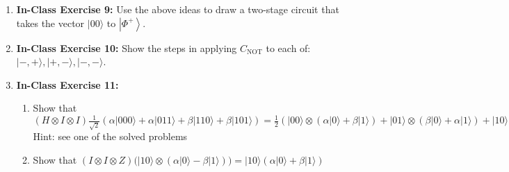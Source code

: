 \documentclass[main.tex]{subfiles}
\begin{document}
\begin{enumerate}
\item[] \textbf{In-Class Exercise 9:} Use the above ideas to draw a two-stage circuit that takes the vector $|00\rangle$ to $\left|\Phi^{+}\right\rangle$.

\item[] \textbf{In-Class Exercise 10:} Show the steps in applying $C_{\text{NOT}}$ to each of: $|-,+\rangle,|+,-\rangle,|-,-\rangle$.


\item[] \textbf{In-Class Exercise 11:}
\begin{enumerate}
    \item [1.] Show that $(H \otimes I \otimes I) \frac{1}{\sqrt{2}}(\alpha|000\rangle+\alpha|011\rangle+\beta|110\rangle+\beta|101\rangle)=\frac{1}{2}(|00\rangle \otimes(\alpha|0\rangle+\beta|1\rangle)+|01\rangle \otimes(\beta|0\rangle+\alpha|1\rangle)+|10\rangle \otimes(\alpha|0\rangle-\beta|1\rangle)+|11\rangle \otimes(\alpha|1\rangle-\beta|0\rangle))$ Hint: see one of the solved problems
    \item [2.] Show that $(I \otimes I \otimes Z)(|10\rangle \otimes(\alpha|0\rangle-\beta|1\rangle))=|10\rangle(\alpha|0\rangle+\beta|1\rangle)$
\end{enumerate}

\end{enumerate}
\end{document}
